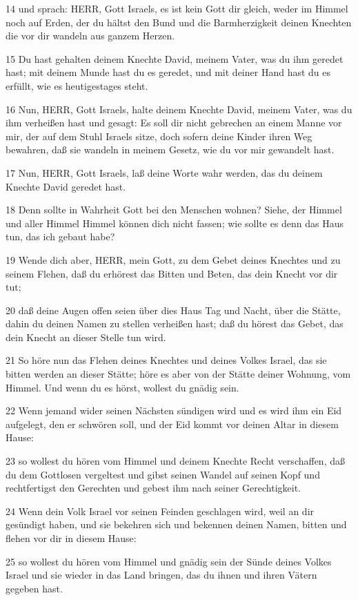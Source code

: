 \par 14 und sprach: HERR, Gott Israels, es ist kein Gott dir gleich, weder im Himmel noch auf Erden, der du hältst den Bund und die Barmherzigkeit deinen Knechten die vor dir wandeln aus ganzem Herzen.
\par 15 Du hast gehalten deinem Knechte David, meinem Vater, was du ihm geredet hast; mit deinem Munde hast du es geredet, und mit deiner Hand hast du es erfüllt, wie es heutigestages steht.
\par 16 Nun, HERR, Gott Israels, halte deinem Knechte David, meinem Vater, was du ihm verheißen hast und gesagt: Es soll dir nicht gebrechen an einem Manne vor mir, der auf dem Stuhl Israels sitze, doch sofern deine Kinder ihren Weg bewahren, daß sie wandeln in meinem Gesetz, wie du vor mir gewandelt hast.
\par 17 Nun, HERR, Gott Israels, laß deine Worte wahr werden, das du deinem Knechte David geredet hast.
\par 18 Denn sollte in Wahrheit Gott bei den Menschen wohnen? Siehe, der Himmel und aller Himmel Himmel können dich nicht fassen; wie sollte es denn das Haus tun, das ich gebaut habe?
\par 19 Wende dich aber, HERR, mein Gott, zu dem Gebet deines Knechtes und zu seinem Flehen, daß du erhörest das Bitten und Beten, das dein Knecht vor dir tut;
\par 20 daß deine Augen offen seien über dies Haus Tag und Nacht, über die Stätte, dahin du deinen Namen zu stellen verheißen hast; daß du hörest das Gebet, das dein Knecht an dieser Stelle tun wird.
\par 21 So höre nun das Flehen deines Knechtes und deines Volkes Israel, das sie bitten werden an dieser Stätte; höre es aber von der Stätte deiner Wohnung, vom Himmel. Und wenn du es hörst, wollest du gnädig sein.
\par 22 Wenn jemand wider seinen Nächsten sündigen wird und es wird ihm ein Eid aufgelegt, den er schwören soll, und der Eid kommt vor deinen Altar in diesem Hause:
\par 23 so wollest du hören vom Himmel und deinem Knechte Recht verschaffen, daß du dem Gottlosen vergeltest und gibst seinen Wandel auf seinen Kopf und rechtfertigst den Gerechten und gebest ihm nach seiner Gerechtigkeit.
\par 24 Wenn dein Volk Israel vor seinen Feinden geschlagen wird, weil an dir gesündigt haben, und sie bekehren sich und bekennen deinen Namen, bitten und flehen vor dir in diesem Hause:
\par 25 so wollest du hören vom Himmel und gnädig sein der Sünde deines Volkes Israel und sie wieder in das Land bringen, das du ihnen und ihren Vätern gegeben hast.
